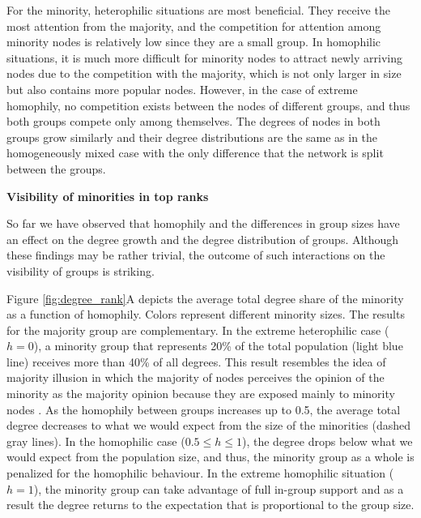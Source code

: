 For the minority, heterophilic situations are most beneficial. They receive the most attention from the majority, and the competition for attention among minority nodes is relatively low since they are a small group. In homophilic situations, it is much more difficult for minority nodes to attract newly arriving nodes due to the competition with the majority, which is not only larger in size but also contains more popular nodes. However, in the case of extreme homophily, no competition exists between the nodes of different groups, and thus both groups compete only among themselves. The degrees of nodes in both groups grow similarly and their degree distributions are the same as in the homogeneously mixed case with the only difference that the network is split between the groups.





\noindent \textbf{Visibility of minorities in top ranks}


\noindent So far we have observed that homophily and the differences in group sizes have an effect on the degree growth and the degree distribution of groups. Although these findings may be rather trivial, the outcome of such interactions on the visibility of groups is striking.


Figure \ref{fig:degree_rank}A depicts the average total degree share of the minority as a function of homophily. Colors represent different minority sizes. The results for the majority group are complementary. In the extreme heterophilic case ($h = 0$), a minority group that represents 20\% of the total population (light blue line) receives more than 40\% of all degrees. This result resembles the idea of majority illusion in which the majority of nodes perceives the opinion of the minority as the majority opinion because they are exposed mainly to minority nodes \cite{lerman2015majority}. As the homophily between groups increases up to 0.5, the average total degree decreases to what we would expect from the size of the minorities (dashed gray lines). In the homophilic case ($0.5 \leq h \leq 1$), the degree drops below what we would expect from the population size, and thus, the minority group as a whole is penalized for the homophilic behaviour. In the extreme homophilic situation ($h = 1$), the minority group can take advantage of full in-group support and as a result the degree returns to the expectation that is proportional to the group size. 




